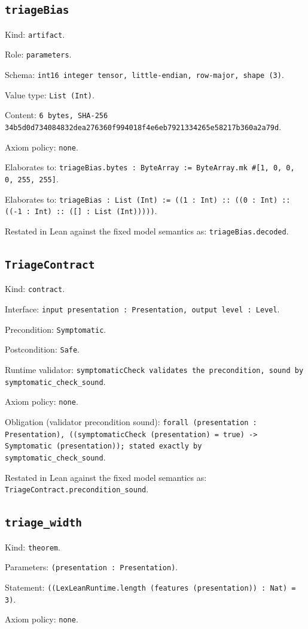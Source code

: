 \documentclass[11pt]{article}
\begin{document}
\subsection*{\texttt{triageBias}}
\noindent Kind: \texttt{artifact}.\par
\noindent Role: \texttt{parameters}.\par
\noindent Schema: \texttt{int16 integer tensor, little-endian, row-major, shape (3)}.\par
\noindent Value type: \texttt{List (Int)}.\par
\noindent Content: \texttt{6 bytes, SHA-256 34b5d0d734084832dea276360f994018f4e6eb7921334265e58217b360a2a79d}.\par
\noindent Axiom policy: \texttt{none}.\par
\noindent Elaborates to: \texttt{triageBias.bytes : ByteArray := ByteArray.mk \#[1, 0, 0, 0, 255, 255]}.\par
\noindent Elaborates to: \texttt{triageBias : List (Int) := ((1 : Int) :: ((0 : Int) :: ((-1 : Int) :: ([] : List (Int)))))}.\par
\noindent Restated in Lean against the fixed model semantics as: \texttt{triageBias.decoded}.\par
\subsection*{\texttt{TriageContract}}
\noindent Kind: \texttt{contract}.\par
\noindent Interface: \texttt{input presentation : Presentation, output level : Level}.\par
\noindent Precondition: \texttt{Symptomatic}.\par
\noindent Postcondition: \texttt{Safe}.\par
\noindent Runtime validator: \texttt{symptomaticCheck validates the precondition, sound by symptomatic\_check\_sound}.\par
\noindent Axiom policy: \texttt{none}.\par
\noindent Obligation (validator precondition sound): \texttt{forall (presentation : Presentation), ((symptomaticCheck (presentation) = true) -> Symptomatic (presentation)); stated exactly by symptomatic\_check\_sound}.\par
\noindent Restated in Lean against the fixed model semantics as: \texttt{TriageContract.precondition\_sound}.\par
\subsection*{\texttt{triage\_width}}
\noindent Kind: \texttt{theorem}.\par
\noindent Parameters: \texttt{(presentation : Presentation)}.\par
\noindent Statement: \texttt{((LexLeanRuntime.length (features (presentation)) : Nat) = 3)}.\par
\noindent Axiom policy: \texttt{none}.\par
\end{document}
